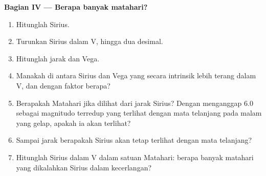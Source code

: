 \begin{problem}
\noindent\textbf{Bagian IV --- Berapa banyak matahari?}
\begin{enumerate}[resume]
  \item Hitunglah  Sirius.
  \item Turunkan  Sirius dalam V, hingga dua desimal.
  \item Hitunglah jarak dan  Vega.
  \item Manakah di antara Sirius dan Vega yang secara intrinsik lebih terang dalam V, dan dengan faktor berapa?
  \item Berapakah  Matahari jika dilihat dari jarak Sirius? Dengan menganggap 6.0 sebagai magnitudo terredup yang terlihat dengan mata telanjang pada malam yang gelap, apakah ia akan terlihat?
  \item Sampai jarak berapakah Sirius akan tetap terlihat dengan mata telanjang?
  \item Hitunglah  Sirius dalam V dalam satuan Matahari: berapa banyak matahari yang dikalahkan Sirius dalam kecerlangan?
\end{enumerate}
\end{problem}
